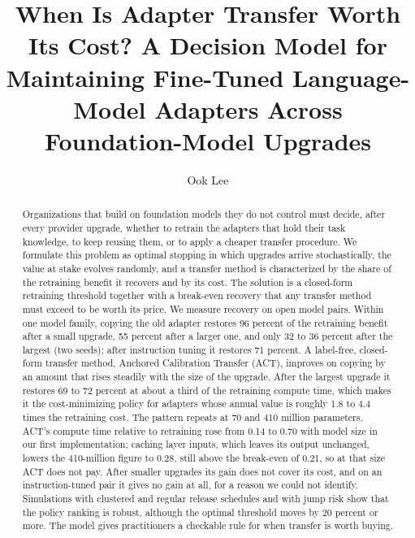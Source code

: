 \documentclass[acmsmall,review]{acmart}
\begin{document}
\title{When Is Adapter Transfer Worth Its Cost? A Decision Model for Maintaining Fine-Tuned Language-Model Adapters Across Foundation-Model Upgrades}

\author{Ook Lee}

\begin{abstract}
Organizations that build on foundation models they do not control must decide, after every provider upgrade, whether to retrain the adapters
that hold their task knowledge, to keep reusing them, or to apply a cheaper transfer procedure. We formulate this problem as optimal stopping in which
upgrades arrive stochastically, the value at stake evolves randomly, and a transfer method is characterized by the share of the retraining benefit
it recovers and by its cost. The solution is a closed-form retraining threshold together with a break-even recovery that any transfer method must exceed
to be worth its price. We measure recovery on open model pairs. Within one model family, copying the old adapter restores 96 percent of the retraining benefit
after a small upgrade, 55 percent after a larger one, and only 32 to 36 percent after the largest (two seeds); after instruction tuning it restores 71 percent.
A label-free, closed-form transfer method, Anchored Calibration Transfer (ACT), improves on copying by an amount that rises steadily with the size of the upgrade.
After the largest upgrade it restores 69 to 72 percent at about a third of the retraining compute time, which makes it the cost-minimizing policy for adapters whose annual value is
roughly 1.8 to 4.4 times the retraining cost. The pattern repeats at 70 and 410 million parameters. ACT's compute time relative to retraining rose from 0.14 to 0.70 with model size in our first implementation; caching layer inputs, which leaves its output unchanged, lowers the 410-million figure to 0.28, still above the break-even of 0.21, so at that size ACT does not pay. After smaller upgrades its gain does not cover its cost, and on an instruction-tuned pair it gives no gain at all, for a reason we could not identify.
Simulations with clustered and regular release schedules and with jump risk show that the policy ranking is robust, although the optimal threshold moves by 20 percent or more.
The model gives practitioners a checkable rule for when transfer is worth buying.
\end{abstract}
\end{document}
